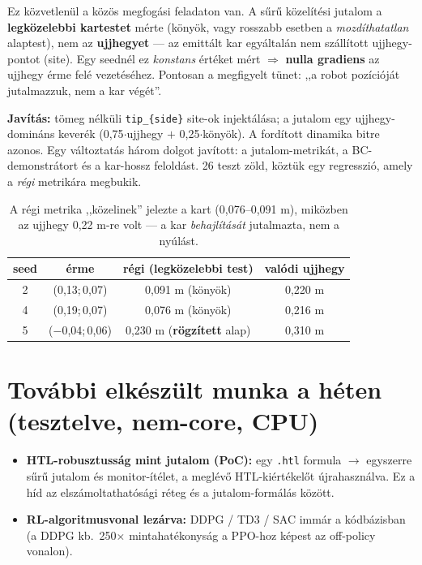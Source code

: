 \documentclass[11pt,a4paper]{article}
\begin{document}
Ez közvetlenül a közös megfogási feladaton van. A sűrű közelítési jutalom a \textbf{legközelebbi
kartestet} mérte (könyök, vagy rosszabb esetben a \emph{mozdíthatatlan} alaptest), nem az
\textbf{ujjhegyet} --- az emittált kar egyáltalán nem szállított ujjhegy-pontot (site). Egy seednél ez
\emph{konstans} értéket mért $\Rightarrow$ \textbf{nulla gradiens} az ujjhegy érme felé vezetéséhez.
Pontosan a megfigyelt tünet: ,,a robot pozícióját jutalmazzuk, nem a kar végét''.

\medskip
\noindent\textbf{Javítás:} tömeg nélküli \texttt{tip\_\{side\}} site-ok injektálása; a jutalom egy
ujjhegy-domináns keverék (0,75$\cdot$ujjhegy $+$ 0,25$\cdot$könyök). A fordított dinamika bitre azonos.
Egy változtatás három dolgot javított: a jutalom-metrikát, a BC-demonstrátort és a kar-hossz feloldást.
26 teszt zöld, köztük egy regresszió, amely a \emph{régi} metrikára megbukik.

\begin{table}[h]
\centering
\small
\begin{tabular}{cccc}
\toprule
seed & érme & régi (legközelebbi test) & valódi ujjhegy \\
\midrule
2 & (0,13;\,0,07) & 0,091 m (könyök)        & 0,220 m \\
4 & (0,19;\,0,07) & 0,076 m (könyök)        & 0,216 m \\
5 & ($-$0,04;\,0,06) & 0,230 m (\textbf{rögzített} alap) & 0,310 m \\
\bottomrule
\end{tabular}
\caption{A régi metrika ,,közelinek'' jelezte a kart (0,076--0,091 m), miközben az ujjhegy 0,22 m-re
volt --- a kar \emph{behajlítását} jutalmazta, nem a nyúlást.}
\end{table}

\section{További elkészült munka a héten (tesztelve, nem-core, CPU)}

\begin{itemize}
  \item \textbf{HTL-robusztusság mint jutalom (PoC):} egy \texttt{.htl} formula $\to$ egyszerre sűrű
        jutalom és monitor-ítélet, a meglévő HTL-kiértékelőt újrahasználva. Ez a híd az
        elszámoltathatósági réteg és a jutalom-formálás között.
  \item \textbf{RL-algoritmusvonal lezárva:} DDPG / TD3 / SAC immár a kódbázisban (a DDPG kb.\
        250$\times$ mintahatékonyság a PPO-hoz képest az off-policy vonalon).
\end{itemize}
\end{document}
